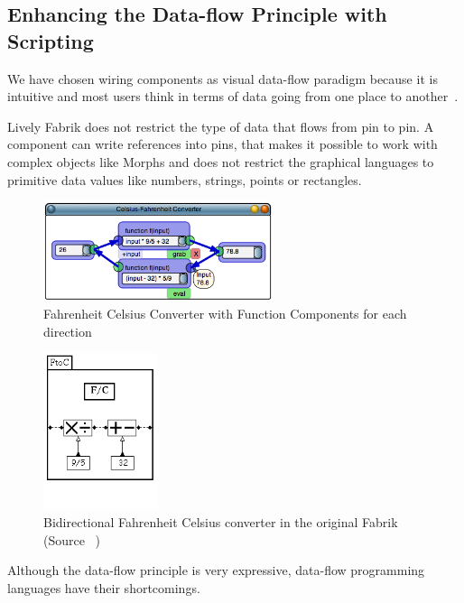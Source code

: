 \documentclass[pdftex, times, 10pt, twocolumn]{article}
\begin{document}
\subsection{Enhancing the Data-flow Principle with Scripting}
We have chosen wiring components as visual data-flow paradigm because it is intuitive and most users think in terms of data going from one place to another~\cite{Baroth1995VPR,Johnston2004ADP}. 

Lively Fabrik does not restrict the type of data that flows from pin to pin. A component can write references into pins, that makes it possible to work with complex objects like Morphs and does not restrict the graphical languages to primitive data values like numbers, strings, points or rectangles.  



\begin{figure}[]\centering
\includegraphics[width=0.600000\textwidth]{FabrikCelsiusFahrenheit.png} 

\caption{Fahrenheit Celsius Converter with Function Components for each direction }
\label{fig:FabrikCelsiusFahrenheit}
\end{figure}


\begin{figure}[]\centering
\includegraphics[width=0.300000\textwidth]{Fabrik_figure2b.png} 

\caption{Bidirectional Fahrenheit Celsius converter in the original Fabrik (Source ~\cite{Ingalls1988FVP}) }
\label{fig:FabrikCelsiusFahrenheitOriginal}
\end{figure}
Although the data-flow principle is very expressive, data-flow programming languages have their shortcomings. 
\end{document}

